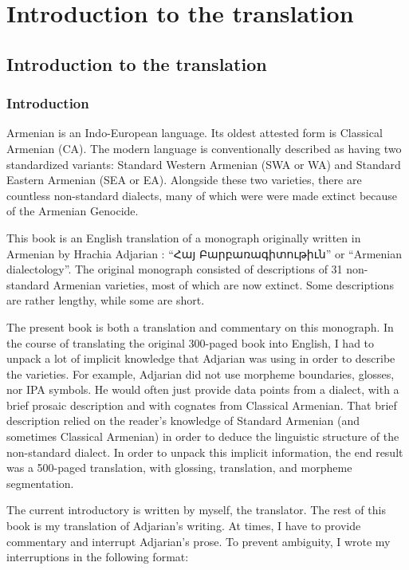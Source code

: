 \part{Introduction to the translation}





\chapter{Introduction to the translation}\label{chapter:HossepIntro}


\section{Introduction}

Armenian is an Indo-European language. Its oldest attested form is Classical Armenian (CA). The modern language is conventionally described as having two standardized variants: Standard Western Armenian (SWA or WA) and Standard Eastern Armenian (SEA or EA). Alongside these two varieties, there are countless non-standard dialects, many of which were were made extinct because of the Armenian Genocide. 

This book is an English translation of a monograph originally written in Armenian by Hrachia Adjarian \citep{Adjarian-1911-DialectologyBook}: ``Հայ Բարբառագիտութիւն'' or ``Armenian dialectology''. The original monograph consisted of descriptions of 31 non-standard Armenian varieties, most of which are now extinct. Some descriptions are rather lengthy, while some are short. 

The present book is both a translation and commentary on this monograph. In the course of translating the original 300-paged book into English, I had to unpack a lot of implicit knowledge that Adjarian was using in order to describe the varieties. For example, Adjarian did not use morpheme boundaries, glosses, nor IPA symbols. He would often just provide data points from a dialect, with a brief prosaic description and with cognates from Classical Armenian. That brief description relied on the reader's knowledge of Standard Armenian (and sometimes Classical Armenian) in order to deduce the linguistic structure of the non-standard dialect. In order to unpack this implicit information, the end result was a 500-paged translation, with glossing, translation, and morpheme segmentation.


The current introductory is written by myself, the translator. The rest of this book is my translation of Adjarian's writing. At times, I have to provide commentary and interrupt Adjarian's prose. To prevent ambiguity, I wrote my interruptions in the following format:

